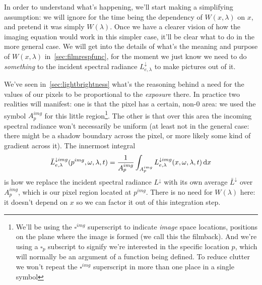 
In order to understand what's happening, we'll start making a simplifying assumption:
we will ignore for the time being the dependency of $W(x,\lambda)$ on $x$, and 
pretend it was simply $W(\lambda)$. 
Once we have a clearer vision of how the imaging equation would work in this
simpler case, it'll be clear what to do in the more general case. 
We will get into the details of what's the meaning and purpose of $W(x,\lambda)$ 
in~\cref{sec:filmrespfunc}, for the moment we just know we need to do 
\emph{something} to the incident \gls{spectral} \gls{radiance} $L^{\downarrow}_{e,\lambda}$ to make
pictures out of it.

We've seen in~\cref{sec:lightbrightness} what's the reasoning behind a need for the values 
of our pixels to be proportional to the \textsl{ \gls{exposure}} there. 
In practice two realities will manifest: one is that the pixel has a certain, 
non-$0$ area: we used the symbol $A^{img}_p$ for this little region\footnote{
	We'll be using the $\square^{img}$ superscript to indicate \textsl{\gls{image}} space 
	locations, positions on the plane where the image is formed (we call this 
	the \gls{filmback}). And we're using a $\square_p$ subscript to signify we're 
	interested in the specific location $p$, which will normally be an argument of a 
	function being defined. To reduce clutter we won't repeat the $\square^{img}$ 
	superscript in more than one place in a single symbol}. 
The other is that over this area the incoming \gls{spectral} 
\gls{radiance} won't necessarily be uniform (at least not in the general case: 
there might be a shadow boundary across the pixel, or more likely some kind of 
gradient across it). 
The innermost integral
\begin{displaymath}
	\bar L^{\downarrow img}_{e,\lambda}(p^{img}, \omega, \lambda, t) = \frac1{A_p^{img}} \int_{A_p^{img}} L^{\downarrow img}_{e,\lambda}(x, \omega, \lambda, t) \mathop{}\!\mathrm{d} x
\end{displaymath}
is how we replace the incident \gls{spectral} \gls{radiance} $L^{\downarrow}$ with 
its own average $\bar L^{\downarrow}$ over $A^{img}_p$, which is our pixel region located at $p^{img}$. 
There is no need for $W(\lambda)$ here: it doesn't depend on $x$ so we can factor it 
out of this integration step.

